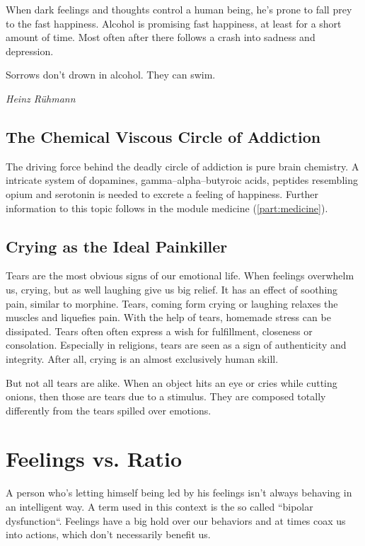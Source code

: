 \documentclass[../Book.Stress_regulation.tex]{subfiles}
\begin{document}
When dark feelings and thoughts control a human being, he's prone to fall prey to the fast happiness.
Alcohol is promising fast happiness, at least for a short amount of time.
Most often after  there follows a crash into sadness and depression.

\epigraph{Sorrows don't drown in alcohol. They can swim.}{\textit{Heinz R\"uhmann}}

\section{The Chemical Viscous Circle of Addiction}

The driving force behind the deadly circle of addiction is pure brain chemistry.
A intricate system of dopamines, gamma--alpha--butyroic acids, peptides resembling opium and serotonin is needed to excrete a feeling of happiness.
Further information to this topic follows in the module medicine (\ref{part:medicine}). %

\section{Crying as the Ideal Painkiller}

Tears are the most obvious signs of our emotional life.
When feelings overwhelm us, crying, but as well laughing give us big relief.
It has an effect of soothing pain, similar to morphine.
Tears, coming form crying or laughing relaxes the muscles and liquefies pain.
With the help of tears, homemade stress can be dissipated.
Tears often often express a wish for fulfillment, closeness or consolation.
Especially in religions, tears are seen as a sign of authenticity and integrity.
After all, crying is an almost exclusively human skill.

But not all tears are alike.
When an object hits an eye or cries while cutting onions, then those are tears due to a stimulus.
They are composed totally differently from the tears spilled over emotions.

\chapter{Feelings vs.  Ratio}

A person who's letting himself being led by his feelings isn't always behaving in an intelligent way.
A term used in this context is the so called ``bipolar dysfunction``.
Feelings have a big hold over our behaviors and at times coax us into actions, which don't necessarily benefit us.
\end{document}
